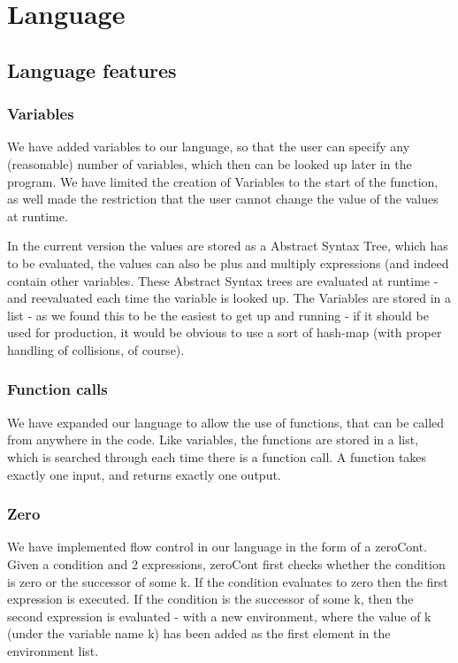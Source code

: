 \section{Language}


\subsection{Language features}
\subsubsection{Variables}
We have added variables to our language, so that the user can specify any (reasonable) number of variables, which then can be looked up later in the program. We have limited the creation of Variables to the start of the function, as well made the restriction that the user cannot change the value of the values at runtime.

In the current version the values are stored as a Abstract Syntax Tree, which has to be evaluated, the values can also be plus and multiply expressions (and indeed contain other variables. These Abstract Syntax trees are evaluated at runtime - and reevaluated each time the variable is looked up. The Variables are stored in a list - as we found this to be the easiest to get up and running - if it should be used for production, it would be obvious to use a sort of hash-map (with proper handling of collisions, of course).

\subsubsection{Function calls}

We have expanded our language to allow the use of functions, that can be called from anywhere in the code. Like variables, the functions are stored in a list, which is searched through each time there is a function call. A function takes exactly one input, and returns exactly one output.

\subsubsection{Zero }
We have implemented flow control in our language in the form of a zeroCont. Given a condition and 2 expressions, zeroCont first checks whether the condition is zero or the successor of some k. If the condition evaluates to zero then the first expression is executed. If the condition is the successor of some k, then the second expression is evaluated - with a new environment, where the value of k (under the variable name k) has been added as the first element in the environment list.


